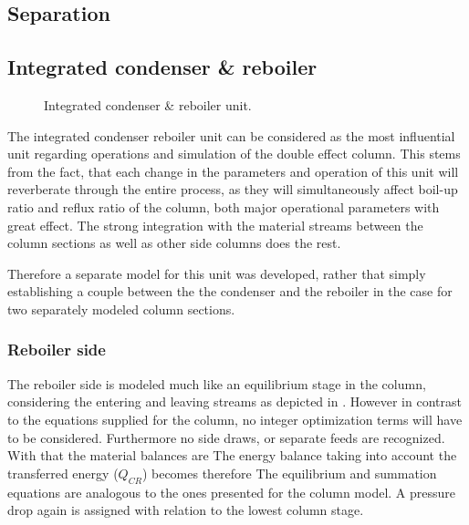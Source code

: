 \subsection{Separation}
\label{sec:mathpro:steady:sep}
    
    
 \subsection{Integrated condenser \& reboiler}
    \label{sec:mathpro:steady:conreb}
        \begin{figure}
            \center
            
            \caption{Integrated condenser \& reboiler unit.}
            \label{fig:mathpro:conreb_ss}
        \end{figure}
        
        The integrated condenser reboiler unit can be considered as the most influential unit regarding operations and 
        simulation of the double effect column. This stems from the fact, that each change in the parameters and operation 
        of this unit will reverberate through the entire process, as they will simultaneously affect boil-up ratio and reflux 
        ratio of the column, both major operational parameters with great effect. The strong integration with the material streams 
        between the column sections as well as other side columns does the rest. 
        
        Therefore a separate model for this unit was developed, rather that simply establishing a couple between the 
        the condenser and the reboiler in the case for two separately modeled column sections. 
        
        \subsubsection{Reboiler side}
            The reboiler side is modeled much like an equilibrium stage in the column, considering the entering and leaving streams 
            as depicted in . However in contrast to the equations supplied for the 
            column, no integer optimization terms will have to be considered. Furthermore no side draws, or separate feeds are
            recognized. With that the material balances are
            The energy balance taking into account the transferred energy ($Q_{CR}$) becomes therefore 
            The equilibrium and summation equations are analogous to the ones presented for the column model. 
            A pressure drop again is assigned with relation to the lowest column stage. 
        
